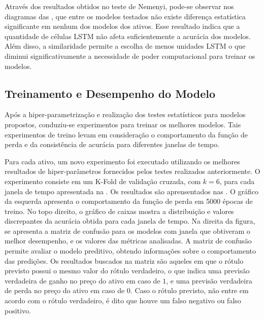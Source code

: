 Através dos resultados obtidos no teste de Nemenyi, pode-se observar nos diagramas das , que entre os modelos testados não existe diferença estatística significante em nenhum dos modelos dos ativos. Esse resultado indica que a quantidade de células \acrshort{LSTM} não afeta suficientemente a acurácia dos modelos. Além disso, a similaridade permite a escolha de menos unidades \acrshort{LSTM} o que diminui significativamente a necessidade de poder computacional para treinar os modelos.


\subsection{Treinamento e Desempenho do Modelo}
\label{exp:train}

Após a hiper-parametrização e realização dos testes estatísticos para modelos propostos, conduziu-se experimentos para treinar os melhores modelos. Tais experimentos de treino levam em consideração o comportamento da função de perda e da consistência de acurácia para diferentes janelas de tempo. 

Para cada ativo, um novo experimento foi executado utilizando os melhores resultados de hiper-parâmetros fornecidos pelos testes realizados anteriormente. O experimento consiste em um K-Fold de validação cruzada, com $k=6$, para cada janela de tempo apresentada na . Os resultados são aprensentados nas . O gráfico da esquerda apresenta o comportamento da função de perda em 5000 épocas de treino. No topo direito, o gráfico de caixas mostra a distribuição e valores discrepantes da acurácia obtida para cada janela de tempo. Na direita da figura, se apresenta a matriz de confusão para os modelos com janela que obtiveram o melhor desempenho, e os valores das métricas analisadas. A matriz de confusão permite avaliar o modelo preditivo, obtendo informações sobre o comportamento das predições. Os resultados buscados na matriz são aqueles em que o rótulo previsto possui o mesmo valor do rótulo verdadeiro, o que indica uma previsão verdadeira de ganho no preço do ativo em caso de $1$, e uma previsão verdadeira de perda no preço do ativo em caso de $0$. Caso o rótulo previsto, não entre em acordo com o rótulo verdadeiro, é dito que houve um falso negativo ou falso positivo.

